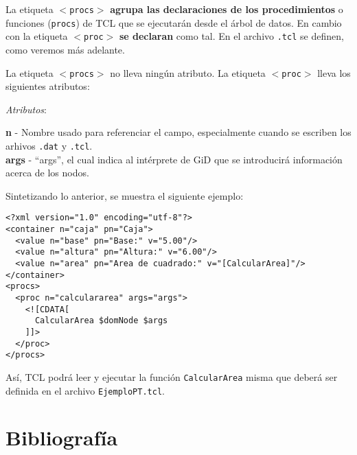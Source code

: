\documentclass[10pt, a4paper, twocolumn]{article} %
\begin{document}
La etiqueta \texttt{$<$procs$>$} \textbf{agrupa las declaraciones de los procedimientos} o funciones (\texttt{procs}) de TCL que se ejecutarán desde el árbol de datos. En cambio con la etiqueta \texttt{$<$proc$>$} \textbf{se declaran} como tal. En el archivo \texttt{.tcl} se definen, como veremos más adelante.

La etiqueta \texttt{$<$procs$>$} no lleva ningún atributo. La etiqueta \texttt{$<$proc$>$} lleva los siguientes atributos:

\vspace{0.15cm}
\textit{Atributos}:

\vspace{0.15cm}
	\textbf{n} - Nombre usado para referenciar el campo, especialmente cuando se escriben los arhivos \texttt{.dat} y \texttt{.tcl}.\\
	\textbf{args} - ``args'', el cual indica al intérprete de GiD que se introducirá información acerca de los nodos.\\
\vspace{0.15cm}

Sintetizando lo anterior, se muestra el siguiente ejemplo:

\lstset{language=XML} 
\begin{lstlisting}
<?xml version="1.0" encoding="utf-8"?>
<container n="caja" pn="Caja">
  <value n="base" pn="Base:" v="5.00"/>
  <value n="altura" pn="Altura:" v="6.00"/>
  <value n="area" pn="Area de cuadrado:" v="[CalcularArea]"/>
</container>
<procs>
  <proc n="calculararea" args="args">
    <![CDATA[
      CalcularArea $domNode $args
    ]]>
  </proc>
</procs>
\end{lstlisting}

Así, TCL podrá leer y ejecutar la función \texttt{CalcularArea} misma que deberá ser definida en el archivo \texttt{EjemploPT.tcl}.

\section{Bibliografía}


\end{document}
